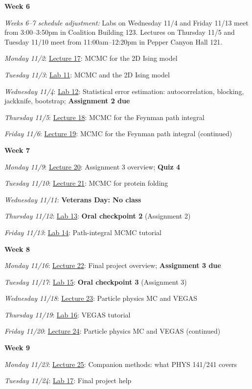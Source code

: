 \documentclass[12pt]{article}
\begin{document}
\newpage
\noindent\textbf{Week 6}

\noindent\emph{Weeks 6--7 schedule adjustment:} Labs on Wednesday 11/4 and Friday 11/13 meet from 3:00--3:50pm in Coalition Building 123. Lectures on Thursday 11/5 and Tuesday 11/10 meet from 11:00am--12:20pm in Pepper Canyon Hall 121.

\emph{Monday 11/2}: \underline{Lecture 17}: MCMC for the 2D Ising model

\emph{Tuesday 11/3}: \underline{Lab 11}: MCMC and the 2D Ising model

\emph{Wednesday 11/4}: \underline{Lab 12}: Statistical error estimation: autocorrelation, blocking, jackknife, bootstrap; \textbf{Assignment 2 due}

\emph{Thursday 11/5}: \underline{Lecture 18}: MCMC for the Feynman path integral

\emph{Friday 11/6}: \underline{Lecture 19}: MCMC for the Feynman path integral (continued)

\noindent\textbf{Week 7}

\emph{Monday 11/9}: \underline{Lecture 20}: Assignment 3 overview; \textbf{Quiz 4}

\emph{Tuesday 11/10}: \underline{Lecture 21}: MCMC for protein folding

\emph{Wednesday 11/11}: \textbf{Veterans Day: No class}

\emph{Thursday 11/12}: \underline{Lab 13}: \textbf{Oral checkpoint 2} (Assignment 2)

\emph{Friday 11/13}: \underline{Lab 14}: Path-integral MCMC tutorial

\noindent\textbf{Week 8}

\emph{Monday 11/16}: \underline{Lecture 22}: Final project overview; \textbf{Assignment 3 due}

\emph{Tuesday 11/17}: \underline{Lab 15}: \textbf{Oral checkpoint 3} (Assignment 3)

\emph{Wednesday 11/18}: \underline{Lecture 23}: Particle physics MC and VEGAS

\emph{Thursday 11/19}: \underline{Lab 16}: VEGAS tutorial

\emph{Friday 11/20}: \underline{Lecture 24}: Particle physics MC and VEGAS (continued)

\noindent\textbf{Week 9}

\emph{Monday 11/23}: \underline{Lecture 25}: Companion methods: what PHYS 141/241 covers

\emph{Tuesday 11/24}: \underline{Lab 17}: Final project help
\end{document}
